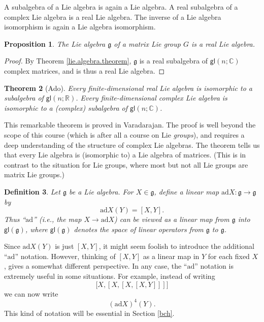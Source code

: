 \documentclass{amsbook}
\let \frak = \mathfrak
\theoremstyle{plain}
\newtheorem{theorem}{Theorem}
\newtheorem{definition}[theorem]{Definition}
\newtheorem{proposition}[theorem]{Proposition}
\numberwithin{equation}{chapter}
\numberwithin{theorem}{chapter}
\begin{document}
A subalgebra of a Lie algebra is again a Lie algebra. A real subalgebra of a
complex Lie algebra is a real Lie algebra. The inverse of a Lie algebra
isomorphism is again a Lie algebra isomorphism.

\begin{proposition}
The Lie algebra $\frak{g}$ of a matrix Lie group $G$ is a real Lie algebra.
\end{proposition}

\begin{proof}
By Theorem \ref{lie.algebra.theorem}, $\frak{g}$ is a real subalgebra of
$\mathsf{gl}(n;\mathbb{C})$ complex matrices, and is thus a real Lie algebra.
\end{proof}

\begin{theorem}
[Ado]Every finite-dimensional real Lie algebra is isomorphic to a subalgebra
of $\mathsf{gl}(n;\mathbb{R})$. Every finite-dimensional complex Lie algebra
is isomorphic to a (complex) subalgebra of $\mathsf{gl}(n;\mathbb{C})$.
\end{theorem}

This remarkable theorem is proved in Varadarajan. The proof is well beyond the
scope of this course (which is after all a course on Lie \textit{groups}), and
requires a deep understanding of the structure of complex Lie algebras. The
theorem tells us that every Lie algebra is (isomorphic to) a Lie algebra of
matrices. (This is in contrast to the situation for Lie groups, where most but
not all Lie groups are matrix Lie groups.)

\begin{definition}
Let $\frak{g}$ be a Lie algebra. For $X\in\frak{g}$, define a linear map
$\mathrm{ad}X:\frak{g}\rightarrow\frak{g}$ by
\[
\mathrm{ad}X(Y)=[X,Y]\text{.}%
\]
Thus ``$\mathrm{ad}$'' (i.e., the map $X\rightarrow\mathrm{ad}X$) can be
viewed as a linear map from $\frak{g}$ into $\mathsf{gl}(\frak{g})$, where
$\mathsf{gl}(\frak{g})$ denotes the space of linear operators from $\frak{g}$
to $\frak{g}$.
\end{definition}

Since $\mathrm{ad}X(Y)$ is just $[X,Y]$, it might seem foolish to introduce
the additional ``$\mathrm{ad}$'' notation. However, thinking of $[X,Y]$ as a
linear map in $Y$ for each fixed $X$, gives a somewhat different perspective.
In any case, the ``$\mathrm{ad}$'' notation is extremely useful in some
situations. For example, instead of writing
\[
\lbrack X,[X,[X,[X,Y]]]]
\]
we can now write
\[
\left(  \mathrm{ad}X\right)  ^{4}(Y)\text{.}%
\]
This kind of notation will be essential in Section \ref{bch}.
\end{document}
